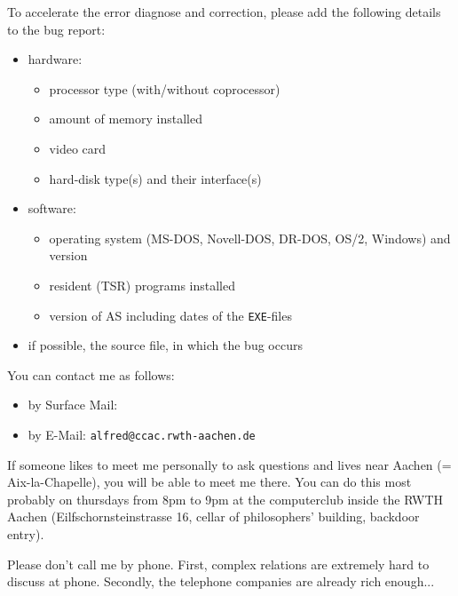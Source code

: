 \documentclass[12pt,twoside]{report}
\newcommand{\tty}[1]{{\tt #1}}
\begin{document}
To accelerate the error diagnose and correction, please add the 
following details to the bug report:
\begin{itemize}
\item{hardware: \begin{itemize}
                \item{processor type (with/without coprocessor)} 
                \item{amount of memory installed}
                \item{video card}
                \item{hard-disk type(s) and their interface(s)}
                \end{itemize}}
\item{software: \begin{itemize}
                \item{operating system (MS-DOS, Novell-DOS, DR-DOS, OS/2, 
                      Windows) and version}
                \item{resident (TSR) programs installed}
                \item{version of AS including dates of the \tty{EXE}-files}
                \end{itemize}}
\item{if possible, the source file, in which the bug occurs} 
\end{itemize}
You can contact me as follows:
\begin{itemize}
\item{by Surface Mail: }
\item{by E-Mail: \tty{alfred@ccac.rwth-aachen.de}}
\end{itemize}
If someone likes to meet me personally to ask questions and lives
near Aachen (= Aix-la-Chapelle), you will be able to meet me there. 
You can do this most probably on thursdays from 8pm to 9pm at the
computerclub inside the RWTH Aachen (Eilfschornsteinstrasse 16,
cellar of philosophers' building, backdoor entry).

Please don't call me by phone.  First, complex relations are
extremely hard to discuss at phone.  Secondly, the telephone
companies are already rich enough...
\end{document}

